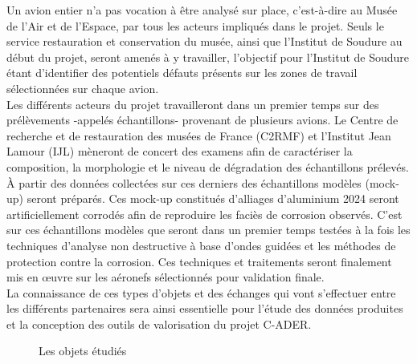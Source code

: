 Un avion entier n’a pas vocation à être analysé sur place, c'est-à-dire au Musée de l’Air et de l’Espace, par tous les acteurs impliqués dans le projet. Seuls le service restauration et conservation du musée, ainsi que l’Institut de Soudure au début du projet, seront amenés à y travailler, l’objectif pour l’Institut de Soudure étant d’identifier des potentiels défauts présents sur les zones de travail sélectionnées sur chaque avion.\\

Les différents acteurs du projet travailleront dans un premier temps sur des prélèvements -appelés échantillons- provenant de plusieurs avions. Le Centre de recherche et de restauration des musées de France (C2RMF) et l’Institut Jean Lamour (IJL) mèneront de concert des examens afin de caractériser la composition, la morphologie et le niveau de dégradation des échantillons prélevés. À partir des données collectées sur ces derniers des échantillons modèles (mock-up) seront préparés. Ces mock-up constitués d’alliages d’aluminium 2024 seront artificiellement corrodés afin de reproduire les faciès de corrosion observés. C’est sur ces échantillons modèles que seront dans un premier temps testées à la fois les techniques d’analyse non destructive à base d’ondes guidées et les méthodes de protection contre la corrosion. Ces techniques et traitements seront finalement mis en œuvre sur les aéronefs sélectionnés pour validation finale.\\

La connaissance de ces types d’objets et des échanges qui vont s’effectuer entre les différents partenaires sera ainsi essentielle pour l’étude des données produites et la conception des outils de valorisation du projet C-ADER.

\clearpage %

\begin{figure}[H]
    \centering
    \caption{Les objets étudiés}
    \label{fig:votre_label2_ici}
\end{figure}
